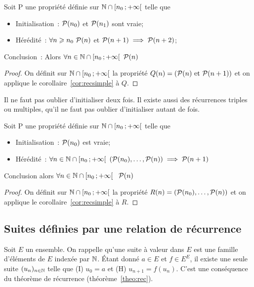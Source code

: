 \begin{cor}
  \label{cor:recdouble}
  Soit P une propriété définie sur \(\N\cap \intervallefo{n_0}{+\infty}\) telle 
  que
  \begin{itemize}
    \item Initialisation~: \(\P(n_0)\) et \(\P(n_1)\) sont vraie;
    \item Hérédité~: \(\forall n\geqslant n_0 \ \P(n)\) et \(\P(n + 1) \implies 
      \P(n + 2)\);
  \end{itemize}
Conclusion~: Alors \(\forall n \in \N\cap \intervallefo{n_0}{+\infty} \ \P(n)\) 
\end{cor}

\begin{proof}
  On définit sur \(\N\cap \intervallefo{n_0}{+\infty}\) la propriété \(Q(n) = 
  (\P(n) \text{~et~} \P(n + 1))\) et on applique le 
  corollaire~\ref{cor:recsimple} à \(Q\).
\end{proof}

Il ne faut pas oublier d'initialiser deux fois. Il existe aussi des récurrences 
triples ou multiples, qu'il ne faut pas oublier d'initialiser autant de fois.

\begin{cor}
  \label{cor:recforte}
  Soit P une propriété définie sur \(\N\cap \intervallefo{n_0}{+\infty}\) telle 
  que
  \begin{itemize}
    \item Initialisation~: \(\P(n_0)\) est vraie;
    \item Hérédité~: \(\forall n \in \N\cap \intervallefo{n_0}{+\infty} \ 
      (\P(n_0), \ldots, \P(n)) \implies \P(n + 1)\)
  \end{itemize}
  Conclusion alors \(\forall n \in \N\cap \intervallefo{n_0}{+\infty}\ \ \P(n)\)
\end{cor}

\begin{proof}
  On définit sur \(\N\cap \intervallefo{n_0}{+\infty}\) la propriété \(R(n) = 
  (\P(n_0), \ldots, \P(n))\) et on applique le corollaire~\ref{cor:recsimple} à 
  \(R\).
\end{proof}

\subsection{Suites définies par une relation de récurrence}

Soit \(E\) un ensemble. On rappelle qu'une suite à valeur dans \(E\) est une 
famille d'éléments de \(E\) indexée par \(\N\). Étant donné \(a\in E\) et \(f\in 
E^E\), il existe une seule suite \((u_n)_{n\in\N}\) telle que (I) \(u_0 = a\) et 
(H) \(u_{n + 1} = f(u_n)\). C'est une conséquence du théorème de récurrence 
(théorème~\ref{theo:rec}).


